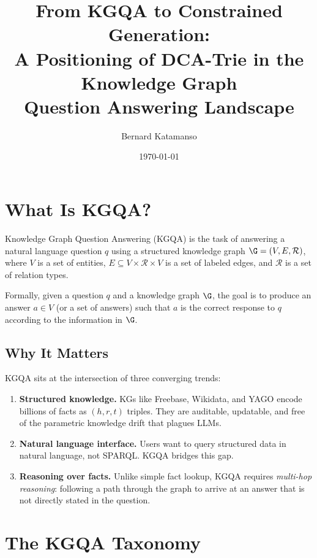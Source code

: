 \documentclass[11pt,a4paper]{article}
\title{From KGQA to Constrained Generation:\\
A Positioning of DCA-Trie in the Knowledge Graph\\
Question Answering Landscape}
\author{Bernard Katamanso}
\date{\today}
\begin{document}
\maketitle

\section{What Is KGQA?}

Knowledge Graph Question Answering (KGQA) is the task of answering a
natural language question $q$ using a structured knowledge graph
$\G = (V, E, \mathcal{R})$, where $V$ is a set of entities, $E \subseteq
V \times \mathcal{R} \times V$ is a set of labeled edges, and
$\mathcal{R}$ is a set of relation types.

Formally, given a question $q$ and a knowledge graph $\G$, the goal is
to produce an answer $a \in V$ (or a set of answers) such that $a$ is
the correct response to $q$ according to the information in $\G$.

\subsection{Why It Matters}

KGQA sits at the intersection of three converging trends:

\begin{enumerate}
  \item \textbf{Structured knowledge.}  KGs like Freebase, Wikidata, and
    YAGO encode billions of facts as $(h, r, t)$ triples.  They are
    auditable, updatable, and free of the parametric knowledge drift
    that plagues LLMs.

  \item \textbf{Natural language interface.}  Users want to query
    structured data in natural language, not SPARQL.  KGQA bridges this
    gap.

  \item \textbf{Reasoning over facts.}  Unlike simple fact lookup, KGQA
    requires \emph{multi-hop reasoning}: following a path through the
    graph to arrive at an answer that is not directly stated in the
    question.
\end{enumerate}

\section{The KGQA Taxonomy}
\end{document}
